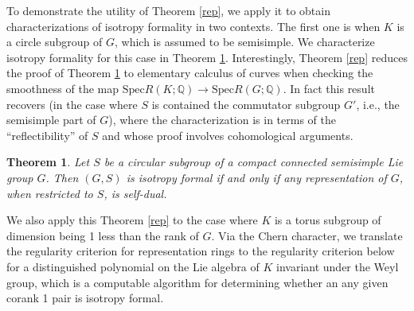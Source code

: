 \documentclass[11pt]{amsart}
\theoremstyle{plain}
\newtheorem{theorem}{Theorem}[section]
\theoremstyle{definition}
\begin{document}
To demonstrate the utility of Theorem \ref{rep}, we apply it to obtain characterizations of isotropy formality in two contexts.  The first one is when $K$ is a circle subgroup of $G$, which is assumed to be semisimple. We characterize isotropy formality for this case in Theorem \ref{circle}. Interestingly, Theorem \ref{rep} reduces the proof of Theorem \ref{circle} to elementary calculus of curves when checking the smoothness of the map $\text{Spec}R(K; \mathbb{Q})\to\text{Spec}R(G; \mathbb{Q})$. In fact this result recovers \cite[Theorem 1.5]{Ca} (in the case where $S$ is contained the commutator subgroup $G'$, i.e., the semisimple part of $G$), where the characterization is in terms of the ``reflectibility'' of $S$ and whose proof involves cohomological arguments.
\begin{theorem}\label{circle}
	Let $S$ be a circular subgroup of a compact connected semisimple Lie group $G$. Then $(G, S)$ is isotropy formal if and only if any representation of $G$, when restricted to $S$, is self-dual. 
\end{theorem}
We also apply this Theorem \ref{rep} to the case where $K$ is a torus subgroup of dimension being 1 less than the rank of $G$. Via the Chern character, we translate the regularity criterion for representation rings to the regularity criterion below for a distinguished polynomial on the Lie algebra of $K$ invariant under the Weyl group, which is a computable algorithm for determining whether an any given corank 1 pair is isotropy formal.
\end{document}
